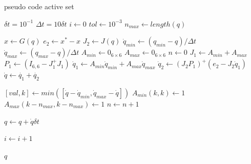 \documentclass[a4paper, 10pt ]{article}
\begin{document}
\begin{algorithm}
\caption{pseudo code active set}
\begin{algorithmic}[1]
\STATE$\delta t=10^{-1}$
\STATE$\Delta t= 10 \delta t$
\STATE $i \leftarrow 0 $ 
\STATE$tol\leftarrow10^{-3}$
\STATE $n_{max}\leftarrow length(q)$

\REPEAT
    \STATE $x \leftarrow G(q)$
	\STATE $e_2 \leftarrow x^*-x$
	\STATE $J_2  \leftarrow J(q)$
	\STATE $ \dot{q}_{min}\leftarrow({q_{min}-q})/{\Delta t}$
	\STATE $ \dot{q}_{max}\leftarrow({q_{max}-q})/{\Delta t}$
	\STATE $A_{min} \leftarrow 0_{6\times6}$
	\STATE $A_{max} \leftarrow 0_{6\times6}$
	\STATE $n\leftarrow0$
    \REPEAT
		\STATE $J_1\leftarrow A_{min}+A_{max}$
		\STATE $P_1 \leftarrow (I_{6,6}-J_1^+J_1)$    
        \STATE $\dot{q}_1\leftarrow A_{min}\dot{q}_{min}+A_{max} \dot{q}_{max}$
		\STATE $\dot{q}_2\leftarrow (J_2P_1)^+(e_2-J_2\dot{q}_1)$
		\STATE $\dot{q}\leftarrow \dot{q_1}+\dot{q_2}$
		
		\STATE $[val,k] \leftarrow min([\dot{q}-\dot{q}_{min} ,\dot{q}_{max}-\dot{q}])$
			\STATE$A_{min}(k,k)\leftarrow 1$
		\ELSE
			\STATE$A_{max}(k-n_{max},k-n_{max})\leftarrow 1$
		\ENDIF
		\STATE $n \leftarrow n+1$

\STATE $q \leftarrow q +\dot{q}\delta t$

\STATE $i \leftarrow i+1$

\RETURN $q$
\end{algorithmic}
\end{algorithm}



\newpage
 

\end{document}
